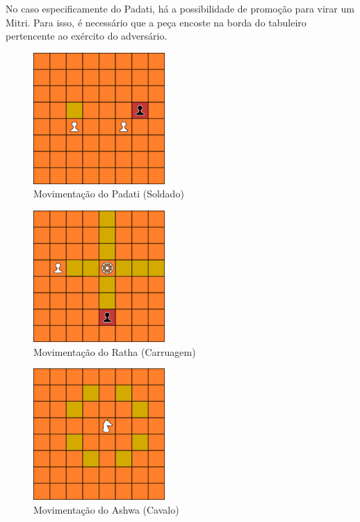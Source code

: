 \documentclass{article}
\begin{document}
    No caso especificamente do Padati, há a possibilidade de promoção para virar um Mitri. Para isso, é necessário que a peça encoste na borda do tabuleiro pertencente ao exército do adversário.
    
    \begin{figure}[h]
    \centering
    \includegraphics[width=5cm]{imgs/padati_moves.png}
    \caption{Movimentação do Padati (Soldado)}
    \label{figura:padati_moves}
    \end{figure}
    
    \begin{figure}[h]
    \centering
    \includegraphics[width=5cm]{imgs/ratha_moves.png}
    \caption{Movimentação do Ratha (Carruagem)}
    \label{figura:ratha_moves}
    \end{figure}

    \begin{figure}[h]
    \centering
    \includegraphics[width=5cm]{imgs/ashwa_moves.png}
    \caption{Movimentação do Ashwa (Cavalo)}
    \label{figura:ashwa_moves}
    \end{figure}
    
\end{document}
